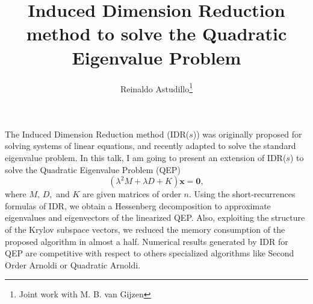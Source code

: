 \documentclass{article}
\title{Induced Dimension Reduction method to solve the Quadratic Eigenvalue Problem}
\author{Reinaldo Astudillo\thanks{Joint work with M. B. van Gijzen}}
\affil{PhD student at TU Delft, The Netherlands}
\date{ }
\newcommand{\vv}[1]{\mathbf{#1}}
\begin{document}
\maketitle
\setcounter{page}{14}
    The Induced Dimension Reduction method (IDR($s$)) was
    originally proposed for solving systems of linear equations, and recently adapted 
    to solve the standard eigenvalue problem. In this talk,  I am going to present an extension of IDR($s$) to solve the Quadratic Eigenvalue Problem (QEP) 
    $$(\lambda^2 M + \lambda D + K)\vv{x} = \vv{0},$$
    where $M,\, D,$ and $K$ are given matrices of order $n$. Using the short-recurrences formulas of IDR, we obtain a Hessenberg decomposition to approximate eigenvalues and eigenvectors 
    of the linearized QEP. Also, exploiting the structure of the Krylov subspace vectors, we reduced the memory consumption of the proposed algorithm in almost a half.
    Numerical results generated by IDR for QEP  are competitive with respect to others specialized algorithms  
    like Second Order Arnoldi or Quadratic Arnoldi.
\end{document}
